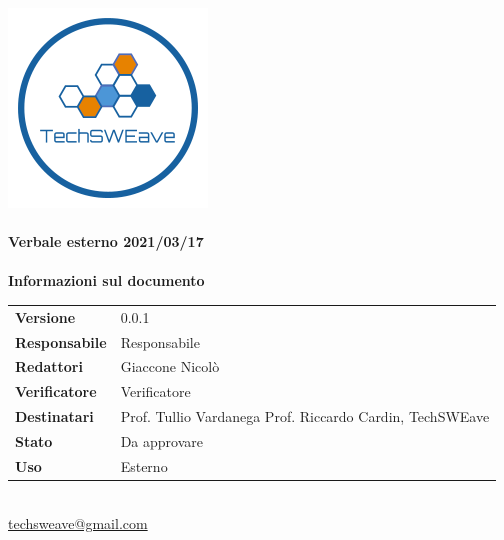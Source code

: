\documentclass[a4paper]{article}
\begin{document}
\begin{titlepage}
    \begin{center}
        \includegraphics{../../../Images/logo.png}\\
        \vspace{20px}
        \textcolor{logo}{\hrulefill}\\
        \vspace{20px}
        \textbf{\huge\textcolor{logo}{Verbale esterno 2021/03/17}}\\
        \vspace{10px}
        \textcolor{logo}{\hrulefill}\\
        \vspace{40px}
        \textbf{\Large Informazioni sul documento}\\
        \vspace{20px}
        \begin{tabular}{p{100px} | p{100px}}
            \textbf{Versione} & 0.0.1\\
            \textbf{Responsabile} & Responsabile\\
            \textbf{Redattori} & Giaccone Nicolò\\
            \textbf{Verificatore} & Verificatore\\
            \textbf{Destinatari} & Prof. Tullio Vardanega \newline Prof. Riccardo Cardin, \newline TechSWEave\\
            \textbf{Stato} & Da approvare\\
            \textbf{Uso} & Esterno\\
        \end{tabular}\\
        \vspace{60px}
        \href{mailto:techsweave@gmail.com}{techsweave@gmail.com}\\

    \end{center}
    \end{titlepage}
\end{document}
